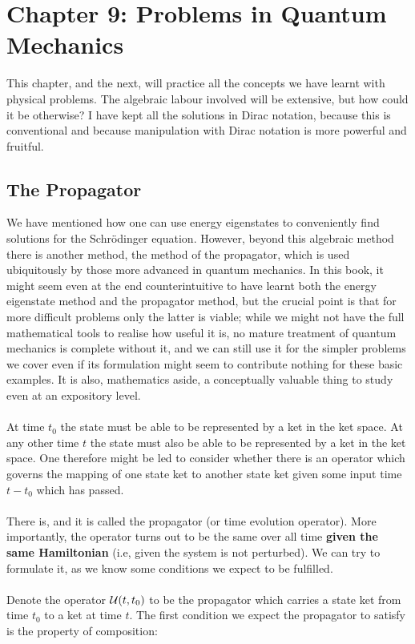 \chapter{Chapter 9: Problems in Quantum Mechanics}
This chapter, and the next, will practice all the concepts we have learnt with physical problems. The algebraic labour involved will be extensive, but how could it be otherwise? I have kept all the solutions in Dirac notation, because this is conventional and because manipulation with Dirac notation is more powerful and fruitful. 
\section{The Propagator}
We have mentioned how one can use energy eigenstates to conveniently find solutions for the Schr\"{o}dinger equation. However, beyond this algebraic method there is another method, the method of the propagator, which is used ubiquitously by those more advanced in quantum mechanics. In this book, it might seem even at the end counterintuitive to have learnt both the energy eigenstate method and the propagator method, but the crucial point is that for more difficult problems only the latter is viable; while we might not have the full mathematical tools to realise how useful it is, no mature treatment of quantum mechanics is complete without it, and we can still use it for the simpler problems we cover even if its formulation might seem to contribute nothing for these basic examples. It is also, mathematics aside, a conceptually valuable thing to study even at an expository level.
\\\\
At time $t_{0}$ the state must be able to be represented by a ket in the ket space. At any other time $t$ the state must also be able to be represented by a ket in the ket space. One therefore might be led to consider whether there is an operator which governs the mapping of one state ket to another state ket given some input time $t-t_{0}$ which has passed.
\\\\
There is, and it is called the propagator (or time evolution operator). More importantly, the operator turns out to be the same over all time \textbf{given the same Hamiltonian} (i.e, given the system is not perturbed). We can try to formulate it, as we know some conditions we expect to be fulfilled.
\\\\
Denote the operator $\mathcal{U}(t,t_{0})$ to be the propagator which carries a state ket from time $t_{0}$ to a ket at time $t$. The first condition we expect the propagator to satisfy is the property of composition:
